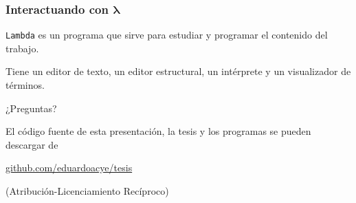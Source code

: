 \documentclass[pdf]{beamer}
\newcommand{\bs}{\boldsymbol}
\begin{document}
\begin{frame}
  \frametitle{Interactuando con \( \bs{λ} \)}
  \texttt{Lambda} es un programa que sirve para estudiar y programar el contenido del trabajo.

  Tiene un editor de texto, un editor estructural, un intérprete y un visualizador de términos.

  \begin{center}
  \end{center}
  
\end{frame}

\begin{frame}[standout]
  \vfill
  {\Huge ¿Preguntas?}
  \vfill
  {
    \small
    El código fuente de esta presentación, la tesis y los programas se pueden descargar de

    \url{github.com/eduardoacye/tesis}

    \vfill
    
    \ccbysa

    {\footnotesize (Atribución-Licenciamiento Recíproco)}
  }
\end{frame}


  
\end{document}
